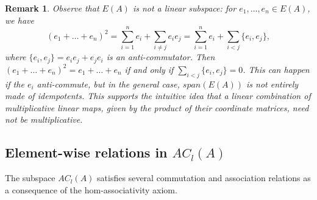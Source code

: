 \documentclass[12pt]{article}
\newtheorem{example}[theorem]{Example}
\newtheorem{remark}[theorem]{Remark}
\begin{document}
		\begin{remark}
			Observe that $E(A)$ is not a linear subspace: for $e_1,\dots,e_n\in E(A)$, we have
			\begin{equation*}
				(e_1+\dots+e_n)^2=\sum\limits_{i=1}^n e_i + \sum\limits_{i\neq j}e_ie_j=\sum\limits_{i=1}^n e_i + \sum\limits_{i< j}\{e_i,e_j\},
			\end{equation*}
			where $\{e_i,e_j\}=e_ie_j+e_je_i$ is an anti-commutator. Then $(e_1+\dots+e_n)^2=e_1+\dots+e_n$ if and only if $\sum\limits_{i< j}\{e_i,e_j\}=0$. This can happen if the $e_i$ anti-commute, but in the general case, $span(E(A))$ is not entirely made of idempotents. This supports the intuitive idea that a linear combination of multiplicative linear maps, given by the product of their coordinate matrices, need not be multiplicative.
		\end{remark}
		
		
		
		\subsection{Element-wise relations in \texorpdfstring{$AC_l(A)$}{AC\_l(A)}}\label{ssec:relations-NA-ACL}
		
		The subspace $AC_l(A)$ satisfies several commutation and association relations as a consequence of the hom-associativity axiom.
		
		
		
\end{document}
